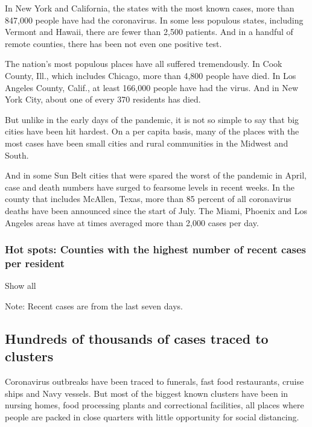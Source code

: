 In New York and California, the states with the most known cases, more
than 847,000 people have had the coronavirus. In some less populous
states, including Vermont and Hawaii, there are fewer than 2,500
patients. And in a handful of remote counties, there has been not even
one positive test.

The nation's most populous places have all suffered tremendously. In
Cook County, Ill., which includes Chicago, more than 4,800 people have
died. In Los Angeles County, Calif., at least 166,000 people have had
the virus. And in New York City, about one of every 370 residents has
died.

But unlike in the early days of the pandemic, it is not so simple to say
that big cities have been hit hardest. On a per capita basis, many of
the places with the most cases have been small cities and rural
communities in the Midwest and South.

And in some Sun Belt cities that were spared the worst of the pandemic
in April, case and death numbers have surged to fearsome levels in
recent weeks. In the county that includes McAllen, Texas, more than 85
percent of all coronavirus deaths have been announced since the start of
July. The Miami, Phoenix and Los Angeles areas have at times averaged
more than 2,000 cases per day.

\hypertarget{hot-spots-counties-with-the-highest-number-of-recent-cases-per-resident}{%
\subsubsection{Hot spots: Counties with the highest number of recent
cases per
resident}\label{hot-spots-counties-with-the-highest-number-of-recent-cases-per-resident}}

Show all

Note: Recent cases are from the last seven days.

\hypertarget{hundreds-of-thousands-of-cases-traced-to-clusters}{%
\subsection{Hundreds of thousands of cases traced to
clusters}\label{hundreds-of-thousands-of-cases-traced-to-clusters}}

Coronavirus outbreaks have been traced to funerals, fast food
restaurants, cruise ships and Navy vessels. But most of the biggest
known clusters have been in nursing homes, food processing plants and
correctional facilities, all places where people are packed in close
quarters with little opportunity for social distancing.


